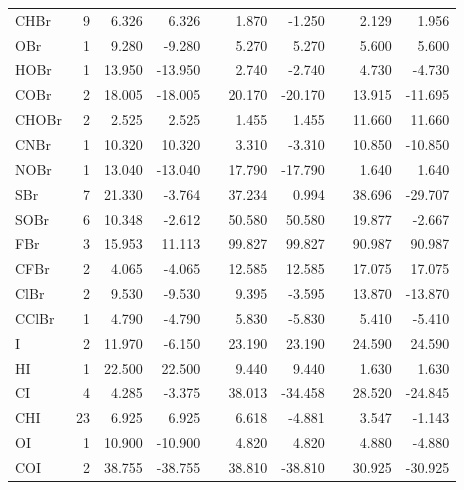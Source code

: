 \begin{table}
\begin{center}
\begin{tabular}{lrrrrrrrrr}
      CHBr    &      9 &    6.326 &    6.326 &  &    1.870 &   -1.250 &  &    2.129 &    1.956 \\
      OBr     &      1 &    9.280 &   -9.280 &  &    5.270 &    5.270 &  &    5.600 &    5.600 \\
      HOBr    &      1 &   13.950 &  -13.950 &  &    2.740 &   -2.740 &  &    4.730 &   -4.730 \\
      COBr    &      2 &   18.005 &  -18.005 &  &   20.170 &  -20.170 &  &   13.915 &  -11.695 \\
      CHOBr   &      2 &    2.525 &    2.525 &  &    1.455 &    1.455 &  &   11.660 &   11.660 \\
      CNBr    &      1 &   10.320 &   10.320 &  &    3.310 &   -3.310 &  &   10.850 &  -10.850 \\
      NOBr    &      1 &   13.040 &  -13.040 &  &   17.790 &  -17.790 &  &    1.640 &    1.640 \\
      SBr     &      7 &   21.330 &   -3.764 &  &   37.234 &    0.994 &  &   38.696 &  -29.707 \\
      SOBr    &      6 &   10.348 &   -2.612 &  &   50.580 &   50.580 &  &   19.877 &   -2.667 \\
      FBr     &      3 &   15.953 &   11.113 &  &   99.827 &   99.827 &  &   90.987 &   90.987 \\
      CFBr    &      2 &    4.065 &   -4.065 &  &   12.585 &   12.585 &  &   17.075 &   17.075 \\
      ClBr    &      2 &    9.530 &   -9.530 &  &    9.395 &   -3.595 &  &   13.870 &  -13.870 \\
      CClBr   &      1 &    4.790 &   -4.790 &  &    5.830 &   -5.830 &  &    5.410 &   -5.410 \\
      I       &      2 &   11.970 &   -6.150 &  &   23.190 &   23.190 &  &   24.590 &   24.590 \\
      HI      &      1 &   22.500 &   22.500 &  &    9.440 &    9.440 &  &    1.630 &    1.630 \\
      CI      &      4 &    4.285 &   -3.375 &  &   38.013 &  -34.458 &  &   28.520 &  -24.845 \\
      CHI     &     23 &    6.925 &    6.925 &  &    6.618 &   -4.881 &  &    3.547 &   -1.143 \\
      OI      &      1 &   10.900 &  -10.900 &  &    4.820 &    4.820 &  &    4.880 &   -4.880 \\
      COI     &      2 &   38.755 &  -38.755 &  &   38.810 &  -38.810 &  &   30.925 &  -30.925 \\

\end{tabular}
\end{center}
\end{table}
